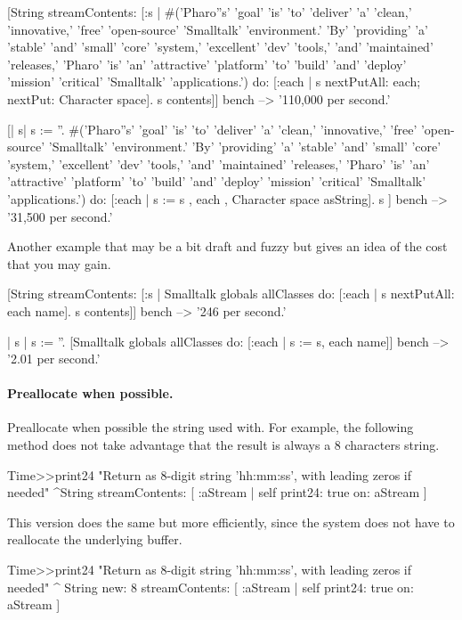 \documentclass[a4paper,10pt,twoside]{book}
\begin{document}
\begin{code}{}
[String streamContents: [:s |
 #('Pharo''s' 'goal' 'is' 'to' 'deliver' 'a' 'clean,' 'innovative,' 'free' 'open-source' 'Smalltalk' 'environment.' 'By' 'providing' 'a' 'stable' 'and' 'small' 'core' 'system,' 'excellent' 'dev' 'tools,' 'and' 'maintained' 'releases,' 'Pharo' 'is' 'an' 'attractive' 'platform' 'to' 'build' 'and' 'deploy' 'mission' 'critical' 'Smalltalk' 'applications.')
 	do: [:each | s nextPutAll: each; nextPut: Character space].
	s contents]] bench 
	--> '110,000 per second.'

[| s| 
s := ''.
 #('Pharo''s' 'goal' 'is' 'to' 'deliver' 'a' 'clean,' 'innovative,' 'free' 'open-source' 'Smalltalk' 'environment.' 'By' 'providing' 'a' 'stable' 'and' 'small' 'core' 'system,' 'excellent' 'dev' 'tools,' 'and' 'maintained' 'releases,' 'Pharo' 'is' 'an' 'attractive' 'platform' 'to' 'build' 'and' 'deploy' 'mission' 'critical' 'Smalltalk' 'applications.')
 	do: [:each | s := s , each , Character space asString].
	s ] bench 
	--> '31,500 per second.'
\end{code}



Another example that may be a bit draft and fuzzy but gives an idea of the cost that you may gain. 

\begin{code}{}
[String streamContents: [:s |
	Smalltalk globals allClasses do: [:each | 
									s nextPutAll: each name].
	s contents]] bench 
	--> '246 per second.'

| s |
s := ''.
[Smalltalk globals allClasses 
	do: [:each | s := s, each name]] bench 
	--> '2.01 per second.'
\end{code}


\paragraph{Preallocate when possible.}
Preallocate when possible the string used with. For example, the following method does not take advantage that the result is always a 8 characters string. 

\begin{code}{}
Time>>print24
 	"Return as 8-digit string 'hh:mm:ss', with leading zeros if needed"
 	^String streamContents:
 		[ :aStream | self print24: true on: aStream ]
\end{code}

This version does the same but more efficiently, since the system does not have to reallocate the underlying buffer. 
\begin{code}{}
Time>>print24
 	"Return as 8-digit string 'hh:mm:ss', with leading zeros if needed"
 	^ String new: 8 streamContents: [ :aStream | 
		self print24: true on: aStream ]
\end{code}		
\end{document}

